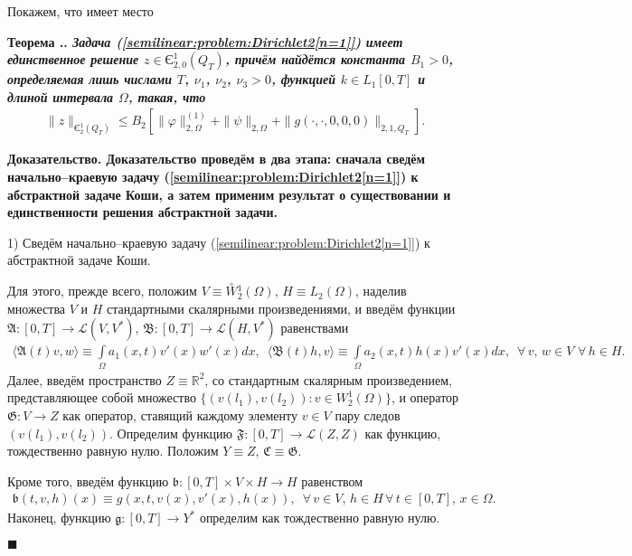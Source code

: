 \documentclass{report}
\newcounter{rem}[section]
\newcounter{lem}[section]
\newcounter{theor}[section]
\renewcommand{\thetheor}{\thesection.\arabic{theor}}
\newenvironment{Theorem}{\par\refstepcounter{theor}\bf Теорема \thetheor. \it}{\rm\par}
\newenvironment{Proof}{\par\noindent\bf Доказательство.\rm}{ $\blacksquare$\par}
\begin{document}
Покажем, что имеет место
\begin{Theorem}\label{unique_existence_theorem:semilinear:problem:Dirichlet2[n=1]}
Задача (\ref{semilinear:problem:Dirichlet2[n=1]}) имеет единственное решение $z\in\textrm{Є}^{1}_{2,0}(Q_T)$, причём найдётся константа $B_1>0$, определяемая лишь числами $T$, $\nu_1$, $\nu_2$, $\nu_3>0$, функцией $k\in L_1[0,T]$ и длиной интервала $\Omega$, такая, что
\begin{gather}\label{sec:semilinear:problem:Dirichlet2[n=1]:a_priori_solution_estimate}
\|z\|_{\textrm{Є}^{1}_{2}(Q_T)}\leqslant B_2[\|\varphi\|^{(1)}_{2,\Omega}+\|\psi\|_{2,\Omega}+\|g(\cdot,\cdot,0,0,0)\|_{2,1,Q_T}].
\end{gather}
\end{Theorem}
\begin{Proof}
Доказательство проведём в два этапа: сначала сведём начально--краевую задачу (\ref{semilinear:problem:Dirichlet2[n=1]}) к абстрактной задаче Коши, а затем применим результат о существовании и единственности решения абстрактной задачи.

1) Сведём начально--краевую задачу  (\ref{semilinear:problem:Dirichlet2[n=1]}) к абстрактной задаче Коши. 

Для этого, прежде всего, положим $V\equiv\stackrel{\circ}{W}{\!\!}^1_2(\Omega)$, $H\equiv L_2(\Omega)$, наделив множества $V$ и $H$ стандартными скалярными произведениями, и введём функции $\mathfrak{A}:[0,T]\to \mathcal{L}(V,V^*)$, $\mathfrak{B}:[0,T]\to \mathcal{L}(H,V^*)$ равенствами
\begin{gather*}
\langle\mathfrak{A}(t)v,w\rangle\equiv\int\limits_\Omega a_1(x,t)v'(x)w'(x)dx,\,\,\,\langle\mathfrak{B}(t)h,v\rangle\equiv\int\limits_\Omega a_2(x,t)h(x)v'(x)dx,\,\,\,\forall\,v,\,w\in V\,\,\forall\,h\in H.
\end{gather*}
Далее, введём пространство $Z\equiv\mathbb{R}^2$, со стандартным скалярным произведением, представляющее собой множество $\{(v(l_1),v(l_2)):v\in W^1_2(\Omega)\}$, и оператор $\mathfrak{G}:V\to Z$ как оператор, ставящий каждому элементу $v\in V$ пару следов $(v(l_1),v(l_2))$. Определим функцию $\mathfrak{F}:[0,T]\to \mathcal{L}(Z,Z)$ как функцию, тождественно равную нулю. Положим $Y\equiv Z$, $\mathfrak{C}\equiv\mathfrak{G}$.

Кроме того, введём функцию $\mathfrak{b}:[0,T]\times V\times H\to H$ равенством 
\begin{gather*}
\mathfrak{b}(t,v,h)(x)\equiv g(x,t,v(x),v'(x),h(x)),\,\,\,\forall\,v\in V,\,h\in H\,\forall\,t\in[0,T],\,x\in\Omega.
\end{gather*}
Наконец, функцию $\mathfrak{g}:[0,T]\to Y^*$ определим как тождественно равную нулю.


\end{Proof}
\end{document}
